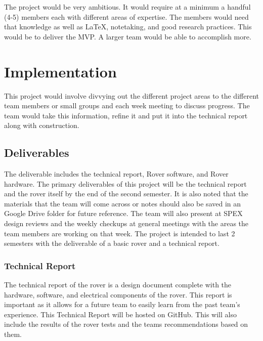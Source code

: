 \documentclass[conference]{IEEEtran} %
\begin{document}
The project would be very ambitious. It would require at a minimum a handful (4-5) members each with different areas of expertise. 
The members would need that knowledge as well as \LaTeX{}, notetaking, and good research practices. 
This would be to deliver the MVP.
A larger team would be able to accomplish more.  

\section{Implementation}
\label{sec:implementation}

This project would involve divvying out the different project areas to the different team members or small groups and each week meeting to discuss progress. 
The team would take this information, refine it and put it into the technical report along with construction.  

\subsection{Deliverables}
\label{subsec:deliverables}

The deliverable includes the technical report, Rover software, and Rover hardware.
The primary deliverables of this project will be the technical report and the rover itself by the end of the second semester.
It is also noted that the materials that the team will come across or notes should also be saved in an Google Drive folder for future reference. 
The team will also present at SPEX design reviews and the weekly checkups at general meetings with the areas the team members are working on that week.
The project is intended to last 2 semesters with the deliverable of a basic rover and a technical report.   

\subsubsection{Technical Report}
\label{techreport}

The technical report of the rover is a design document complete with the hardware, software, and electrical components of the rover. This report is important as it allows for a future team to easily learn from the past team's experience. This Technical Report will be hosted on GitHub. This will also include the results of the rover tests and the teams recommendations  based on them. 
\end{document}
